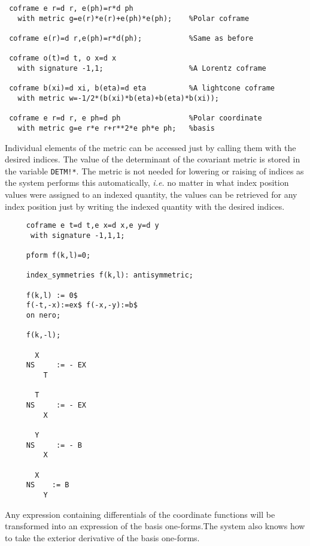 \example{}

\begin{verbatim}
 coframe e r=d r, e(ph)=r*d ph
   with metric g=e(r)*e(r)+e(ph)*e(ph);    %Polar coframe

 coframe e(r)=d r,e(ph)=r*d(ph);           %Same as before

 coframe o(t)=d t, o x=d x
   with signature -1,1;                    %A Lorentz coframe

 coframe b(xi)=d xi, b(eta)=d eta          %A lightcone coframe
   with metric w=-1/2*(b(xi)*b(eta)+b(eta)*b(xi));

 coframe e r=d r, e ph=d ph                %Polar coordinate
   with metric g=e r*e r+r**2*e ph*e ph;   %basis

\end{verbatim}

Individual elements of the metric can be accessed just by calling them
with the desired indices. The value of the determinant of the
 
covariant metric is stored in the variable \texttt{DETM!*}.  The metric
is not needed for lowering or raising of indices as the system
performs this automatically, \emph{i.e.} no matter in what index
position values were assigned to an indexed quantity, the values can
be retrieved for any index position just by writing the indexed
quantity with the desired indices.

\example{}

\begin{verbatim}
     coframe e t=d t,e x=d x,e y=d y
      with signature -1,1,1;

     pform f(k,l)=0;

     index_symmetries f(k,l): antisymmetric;

     f(k,l) := 0$
     f(-t,-x):=ex$ f(-x,-y):=b$
     on nero;

     f(k,-l);

       X
     NS     := - EX
         T

       T
     NS     := - EX
         X

       Y
     NS     := - B
         X

       X
     NS    := B
         Y
\end{verbatim}

Any expression containing differentials of the coordinate functions will
be transformed into an expression of the basis one-forms.The system also
knows how to take the exterior derivative of the basis one-forms.

